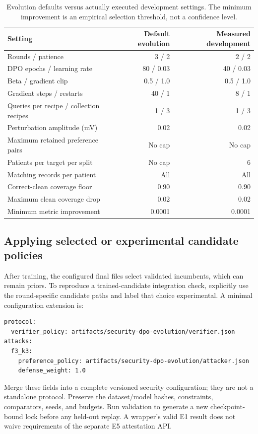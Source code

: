 \begin{table}[htbp]\centering\small
\begin{tabular}{lrr}
\toprule Setting & Default evolution & Measured development\\\midrule
Rounds / patience & 3 / 2 & 2 / 2\\
DPO epochs / learning rate & 80 / 0.03 & 40 / 0.03\\
Beta / gradient clip & 0.5 / 1.0 & 0.5 / 1.0\\
Gradient steps / restarts & 40 / 1 & 8 / 1\\
Queries per recipe / collection recipes & 1 / 3 & 1 / 3\\
Perturbation amplitude (mV) & 0.02 & 0.02\\
Maximum retained preference pairs & No cap & No cap\\
Patients per target per split & No cap & 6\\
Matching records per patient & All & All\\
Correct-clean coverage floor & 0.90 & 0.90\\
Maximum clean coverage drop & 0.02 & 0.02\\
Minimum metric improvement & 0.0001 & 0.0001\\\bottomrule
\end{tabular}
\caption{Evolution defaults versus actually executed development settings. The minimum improvement is an empirical selection threshold, not a confidence level.}
\end{table}

\subsection{Applying selected or experimental candidate policies}
After training, the configured final files select validated incumbents, which can remain priors. To reproduce a trained-candidate integration check, explicitly use the round-specific candidate paths and label that choice experimental. A minimal configuration extension is:
\begin{lstlisting}
protocol:
  verifier_policy: artifacts/security-dpo-evolution/verifier.json
attacks:
  f3_k3:
    preference_policy: artifacts/security-dpo-evolution/attacker.json
    defense_weight: 1.0
\end{lstlisting}
Merge these fields into a complete versioned security configuration; they are not a standalone protocol. Preserve the dataset/model hashes, constraints, comparators, seeds, and budgets. Run validation to generate a new checkpoint-bound lock before any held-out replay. A wrapper's valid E1 result does not waive requirements of the separate E5 attestation API.

